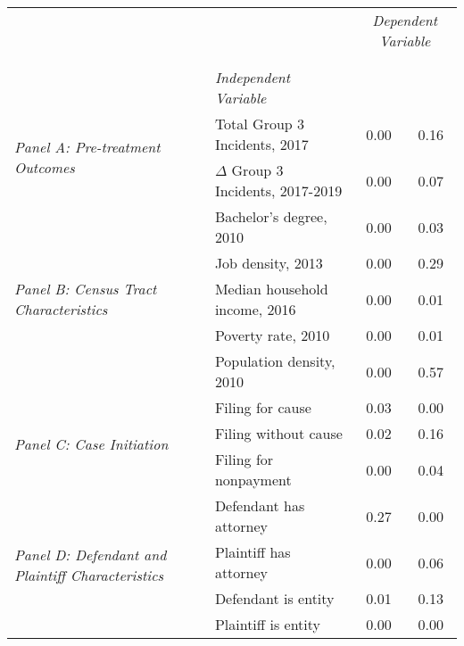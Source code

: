 \begin{tabular}{llcc}
\toprule
 &  & \multicolumn{2}{c}{\textit{Dependent Variable}} \\
\cline{3-4}
\\
 &  &  &  \\
 & \emph{Independent Variable} &  &  \\
\midrule
\multirow[c]{2}{3cm}{\textit{Panel A: Pre-treatment Outcomes}} & Total Group 3 Incidents, 2017 & 0.00 & 0.16 \\
 & $\Delta$ Group 3 Incidents, 2017-2019 & 0.00 & 0.07 \\
\cline{1-4}
\multirow[c]{5}{3cm}{\textit{Panel B: Census Tract Characteristics}} & Bachelor's degree, 2010 & 0.00 & 0.03 \\
 & Job density, 2013 & 0.00 & 0.29 \\
 & Median household income, 2016 & 0.00 & 0.01 \\
 & Poverty rate, 2010 & 0.00 & 0.01 \\
 & Population density, 2010 & 0.00 & 0.57 \\
\cline{1-4}
\multirow[c]{3}{3cm}{\textit{Panel C: Case Initiation}} & Filing for cause & 0.03 & 0.00 \\
 & Filing without cause & 0.02 & 0.16 \\
 & Filing for nonpayment & 0.00 & 0.04 \\
\cline{1-4}
\multirow[c]{4}{3cm}{\textit{Panel D: Defendant and Plaintiff Characteristics}} & Defendant has attorney & 0.27 & 0.00 \\
 & Plaintiff has attorney & 0.00 & 0.06 \\
 & Defendant is entity & 0.01 & 0.13 \\
 & Plaintiff is entity & 0.00 & 0.00 \\
\cline{1-4}
\bottomrule
\end{tabular}
